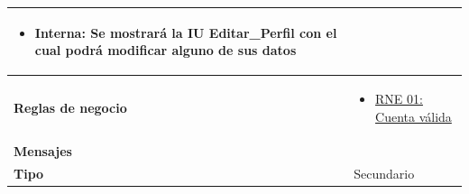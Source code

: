 \begin{center}
\begin{longtable}{| p{3.5cm} | p{11.5cm} |}
		\begin{itemize}
	              \item Interna: Se mostrará la IU Editar_Perfil con el cual podrá modificar alguno de sus datos
	            \end{itemize} \\
        \hline
          \textbf{Reglas de negocio} & 
		\begin{itemize}
	         	  \item {\hyperref[rnr_01]{RNE 01: Cuenta válida}}
		 \end{itemize} \\
        \hline
          \textbf{Mensajes} & \\
        \hline
          \textbf{Tipo} & Secundario\\
        \hline      
  \end{longtable}
\end{center}
\endgroup

